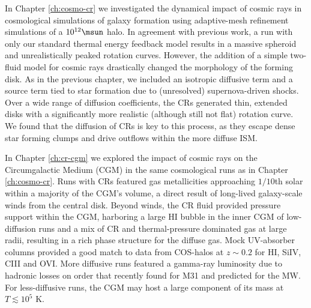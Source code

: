 In Chapter \ref{ch:cosmo-cr} we investigated the dynamical impact of cosmic rays in cosmological simulations of galaxy formation using adaptive-mesh refinement simulations of a $10^{12} \msun$ halo. In agreement with previous work, a run with only our standard thermal energy feedback model results in a massive spheroid and unrealistically peaked rotation curves.  However, the addition of a simple two-fluid model for cosmic rays drastically changed the morphology of the forming disk.  As in the previous chapter, we included an isotropic diffusive term and a source term tied to star formation due to (unresolved) supernova-driven shocks.  Over a wide range of diffusion coefficients, the CRs generated thin, extended disks with a significantly more realistic (although still not flat) rotation curve.  We found that the diffusion of CRs is key to this process, as they escape dense star forming clumps and drive outflows within the more diffuse ISM.

In Chapter \ref{ch:cr-cgm} we explored the impact of cosmic rays on the Circumgalactic Medium (CGM) in the same cosmological runs as in Chapter \ref{ch:cosmo-cr}. Runs with CRs featured gas metallicities approaching $1/10$th solar within a majority of the CGM's volume, a direct result of long-lived galaxy-scale winds from the central disk. Beyond winds, the CR fluid provided pressure support within the CGM, harboring a large HI bubble in the inner CGM of low-diffusion runs and a mix of CR and thermal-pressure dominated gas at large radii, resulting in a rich phase structure for the diffuse gas. Mock UV-absorber columns provided a good match to data from COS-halos at $z \sim 0.2$ for HI, SiIV, CIII and OVI. More diffusive runs featured a gamma-ray luminosity due to hadronic losses on order that recently found for M31 and predicted for the MW. For less-diffusive runs, the CGM may host a large component of its mass at $T \lesssim 10^5$ K.

